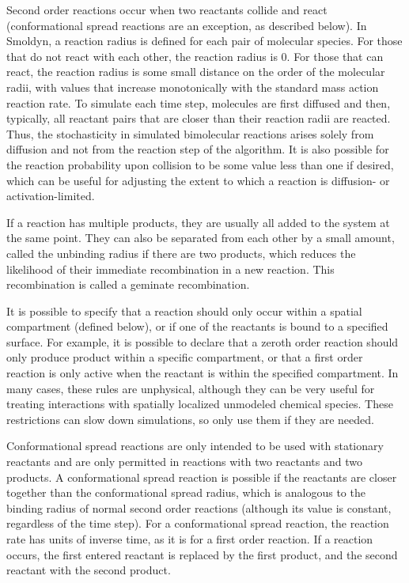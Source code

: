 \documentclass {scrbook}
\begin{document}
Second order reactions occur when two reactants collide and react (conformational spread reactions are an exception, as described below). In Smoldyn, a reaction radius is defined for each pair of molecular species. For those that do not react with each other, the reaction radius is 0. For those that can react, the reaction radius is some small distance on the order of the molecular radii, with values that increase monotonically with the standard mass action reaction rate. To simulate each time step, molecules are first diffused and then, typically, all reactant pairs that are closer than their reaction radii are reacted. Thus, the stochasticity in simulated bimolecular reactions arises solely from diffusion and not from the reaction step of the algorithm. It is also possible for the reaction probability upon collision to be some value less than one if desired, which can be useful for adjusting the extent to which a reaction is diffusion- or activation-limited.

If a reaction has multiple products, they are usually all added to the system at the same point. They can also be separated from each other by a small amount, called the unbinding radius if there are two products, which reduces the likelihood of their immediate recombination in a new reaction. This recombination is called a geminate recombination.

It is possible to specify that a reaction should only occur within a spatial compartment (defined below), or if one of the reactants is bound to a specified surface. For example, it is possible to declare that a zeroth order reaction should only produce product within a specific compartment, or that a first order reaction is only active when the reactant is within the specified compartment. In many cases, these rules are unphysical, although they can be very useful for treating interactions with spatially localized unmodeled chemical species. These restrictions can slow down simulations, so only use them if they are needed.

Conformational spread reactions are only intended to be used with stationary reactants and are only permitted in reactions with two reactants and two products. A conformational spread reaction is possible if the reactants are closer together than the conformational spread radius, which is analogous to the binding radius of normal second order reactions (although its value is constant, regardless of the time step). For a conformational spread reaction, the reaction rate has units of inverse time, as it is for a first order reaction. If a reaction occurs, the first entered reactant is replaced by the first product, and the second reactant with the second product.
\end{document}
